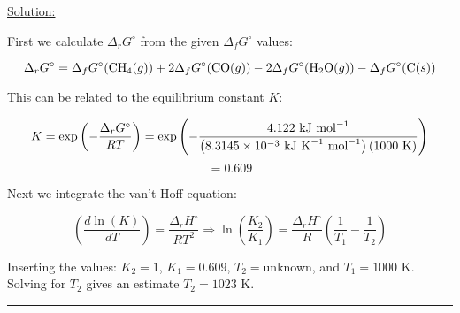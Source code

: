 \noindent
\underline{Solution:}

First we calculate $\Delta_rG^\circ$ from the given $\Delta_fG^\circ$ values:

$$\Delta_rG^\circ = \Delta_fG^\circ(\textnormal{CH}_4(g)) + 2\Delta_fG^\circ(\textnormal{CO}(g)) - 2\Delta_fG^\circ(\textnormal{H}_2\textnormal{O}(g)) - \Delta_fG^\circ(\textnormal{C}(s))$$

This can be related to the equilibrium constant $K$:

$$K = \exp\left(-\frac{\Delta_rG^\circ}{RT}\right) = \exp\left(-\frac{4.122\textnormal{ kJ mol}^{-1}}{\left(8.3145\times 10^{-3}\textnormal{ kJ K}^{-1}\textnormal{ mol}^{-1}\right)\left(1000\textnormal{ K}\right)}\right)$$
$$ = 0.609$$

Next we integrate the van't Hoff equation:

$$\left(\frac{d\ln(K)}{dT}\right) = \frac{\Delta_rH^\circ}{RT^2} \Rightarrow \ln\left(\frac{K_2}{K_1}\right) = \frac{\Delta_rH^\circ}{R}\left(\frac{1}{T_1} - \frac{1}{T_2}\right)$$

Inserting the values: $K_2 = 1$, $K_1 = 0.609$, $T_2 = $unknown, and $T_1 = 1000$ K. Solving for $T_2$ gives an estimate $T_2 = 1023$ K.

\hrule\vspace{0.5cm}

